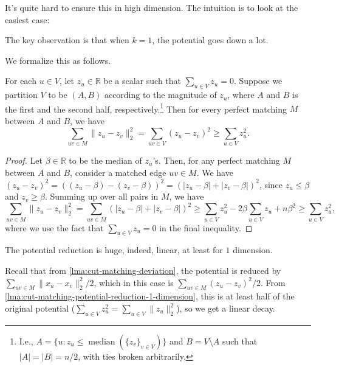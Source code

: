 It's quite hard to ensure this in high dimension. The intuition is to look at the easiest case:

\begin{intuition}
	The key observation is that when \(k = 1\), the potential goes down a lot.
\end{intuition}

We formalize this as follows.

\begin{lemma}\label{lma:cut-matching-potential-reduction-1-dimension}
	For each \(u \in V\), let \(z_u \in \mathbb{R} \) be a scalar such that \(\sum_{u \in V} z_u = 0\). Suppose we partition \(V\) to be \((A, B)\) according to the magnitude of \(z_u\), where \(A\) and \(B\) is the first and the second half, respectively.\footnote{I.e., \(A = \{ u \colon z_u \leq \operatorname{median}(\{ z_v\} _{v \in V}) \} \) and \(B = V \setminus A\) such that \(\lvert A \rvert = \lvert B \rvert = n / 2\), with ties broken arbitrarily.} Then for every perfect matching \(M\) between \(A\) and \(B\), we have
	\[
		\sum_{uv \in M} \lVert z_u - z_v \rVert _2^2
		= \sum_{uv \in V} (z_u - z_v)^2
		\geq \sum_{u \in V} z_u^2.
	\]
\end{lemma}
\begin{proof}
	Let \(\beta \in \mathbb{R} \) to be the median of \(z_u\)'s. Then, for any perfect matching \(M\) between \(A\) and \(B\), consider a matched edge \(uv \in M\). We have \((z_u - z_v)^2 = ((z_u - \beta) - (z_v - \beta ))^2 = (\lvert z_u - \beta \rvert + \lvert z_v - \beta \rvert )^2\), since \(z_u \leq \beta \) and \(z_v \geq \beta \). Summing up over all pairs in \(M\), we have
	\[
		\sum_{uv \in M} \lVert z_u - z_v \rVert _2^2
		= \sum_{uv \in M} (\lvert z_u - \beta \rvert + \lvert z_v - \beta \rvert )^2
		\geq \sum_{u \in V} z_u^2 - 2\beta \sum_{u \in V} z_u + n \beta ^2
		\geq \sum_{u \in V} z_u^2,
	\]
	where we use the fact that \(\sum_{u \in V} z_u = 0\) in the final inequality.
\end{proof}

\begin{remark}
	The potential reduction is huge, indeed, linear, at least for \(1\) dimension.
\end{remark}
\begin{explanation}
	Recall that from \autoref{lma:cut-matching-deviation}, the potential is reduced by \(\sum_{uv \in M} \lVert x_u - x_v \rVert _2^2 / 2\), which in this case is \(\sum_{uv \in M} (z_u - z_v)^2 / 2\). From \autoref{lma:cut-matching-potential-reduction-1-dimension}, this is at least half of the original potential (\(\sum_{u \in V} z_u^2 = \sum_{u \in V} \lVert z_u \rVert _2^2\)), so we get a linear decay.
\end{explanation}

